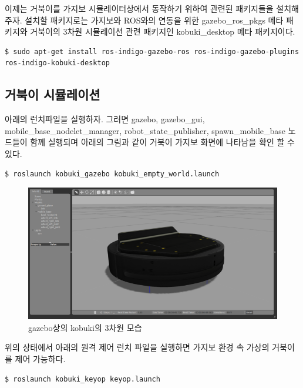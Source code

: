 이제는 거북이를 가지보 시뮬레이터상에서 동작하기 위하여 관련된 패키지들을 설치해주자. 설치할 패키지로는 가지보와 ROS와의 연동을 위한 gazebo\_ros\_pkgs 메타 패키지와 거북이의 3차원 시뮬레이션 관련 패키지인 kobuki\_desktop 메타 패키지이다.

\vspace{\baselineskip}
\begin{lstlisting}[language=ROS]
$ sudo apt-get install ros-indigo-gazebo-ros ros-indigo-gazebo-plugins ros-indigo-kobuki-desktop
\end{lstlisting}

\subsection{거북이 시뮬레이션}

아래의 런치파일을 실행하자. 그러면 gazebo, gazebo\_gui, mobile\_base\_nodelet\_manager, robot\_state\_publisher, spawn\_mobile\_base 노드들이 함께 실행되며 아래의 그림과 같이 거북이 가지보 화면에 나타남을 확인 할 수 있다.

\vspace{\baselineskip}
\begin{lstlisting}[language=ROS]
$ roslaunch kobuki_gazebo kobuki_empty_world.launch
\end{lstlisting}

\begin{figure}[h]
\centering\includegraphics[width=0.9\columnwidth]{pictures/chapter10/gazebo_kobuki.png}
\caption{gazebo상의 kobuki의 3차원 모습}
\end{figure}

위의 상태에서 아래의 원격 제어 런치 파일을 실행하면 가지보 환경 속 가상의 거북이를 제어 가능하다.

\vspace{\baselineskip}
\begin{lstlisting}[language=ROS]
$ roslaunch kobuki_keyop keyop.launch
\end{lstlisting}


